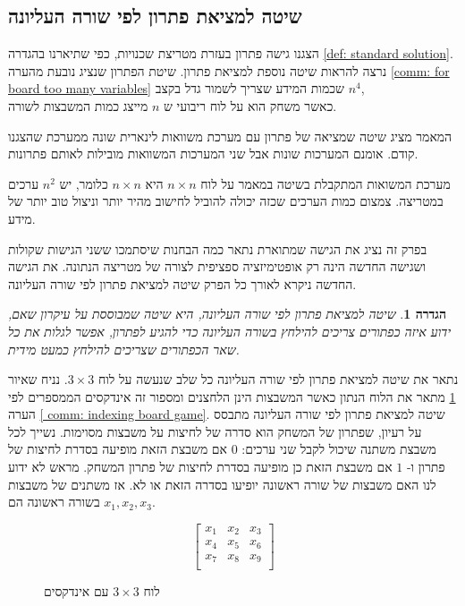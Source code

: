 \documentclass[12pt,leqno]{article}
\newtheorem{definition}{הגדרה}[section]
\begin{document}
\subsection{שיטה למציאת פתרון לפי שורה העליונה}
הצגנו גישה פתרון
בעזרת מטריצת שכנויות, 
כפי שתיארנו
בהגדרה
\ref{def: standard solution}.
נרצה להראות שיטה נוספת למציאת פתרון.
שיטת הפתרון שנציג נובעת מהערה 
\ref{comm: for board too many variables}
שכמות המידע שצריך לשמור גדל בקצב 
$n^4$,
\\
כאשר
משחק הוא על לוח ריבועי ש
$n$
מייצג
כמות המשבצות לשורה.

המאמר 
\cite{B1}
מציג שיטה שמציאה של פתרון עם מערכת משוואות לינארית שונה ממערכת שהצגנו קודם.
אומנם המערכות שונות אבל שני המערכות המשוואות מובילות לאותם פתרונות.

מערכת המשואות המתקבלת בשיטה במאמר 
\cite{B1}
על לוח
$n \times n $
היא 
$n \times n $
כלומר,
יש 
$n^2$
ערכים במטריצה.
צמצום כמות הערכים שכזה יכולה להוביל לחישוב מהיר יותר וניצול טוב יותר של מידע.

בפרק זה נציג את הגישה שמתוארת 
\cite{B1}
נתאר כמה הבחנות שיסתמכו ששני הגישות שקולות ושגישה החדשה הינה רק אופטימיזציה
ספציפית לצורה של מטריצה הנתונה.
את הגישה החדשה ניקרא לאורך כל הפרק שיטה למציאת פתרון לפי שורה העליונה.
\begin{definition}
    \label{def: spanish way}
    שיטה למציאת פתרון לפי שורה העליונה, היא שיטה שמבוססת על עיקרון 
    שאם, ידוע איזה כפתורים צריכים להילחץ בשורה העליונה כדי להגיע לפתרון, אפשר לגלות את כל שאר הכפתורים שצריכים להילחץ 
    כמעט מידית.
\end{definition}
נתאר את 
שיטה למציאת פתרון לפי שורה העליונה
כל שלב שנעשה
על לוח 
$3 \times 3$.
נניח שאיור 
\ref{fig: 3 x 3 board indexed}
מתאר את הלוח הנתון כאשר המשבצות הינן הלחצנים ומספור זה אינדקסים 
הממספרים לפי
הערה 
\ref{ comm: indexing board game}.
שיטה למציאת פתרון לפי שורה העליונה
מתבסס על רעיון,
שפתרון של המשחק הוא סדרה של לחיצות על משבצות מסוימות. נשייך
 לכל משבצת משתנה שיכול לקבל שני ערכים: 
 $0$
  אם משבצת הזאת מופיעה בסדרת לחיצות של פתרון
 ו-
 $1$
 אם משבצת הזאת כן מופיעה בסדרת לחיצות של פתרון המשחק.
  מראש לא ידוע לנו
 האם משבצות של שורה ראשונה יופיעו בסדרה הזאת או לא. אז משתנים של משבצות בשורה ראשונה הם
 $x_1, x_2, x_3$.

\begin{figure}[ht]
    \caption{לוח 
    $3 \times 3$
    עם אינדקסים}
    \label{fig: 3 x 3 board indexed}
    \centering
    \[\begin{bmatrix}
        x_1 & x_2 & x_3 \\
        x_4 & x_5 & x_6 \\
        x_7 & x_8 & x_9 \\
    \end{bmatrix}    
    \]
\end{figure}
\end{document}
